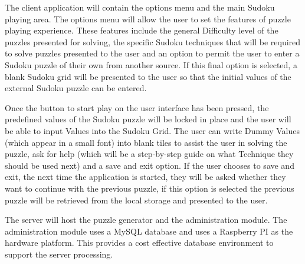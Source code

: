 \documentclass[fleqn]{article}
\begin{document}
The client application will contain the options menu and the main Sudoku playing area. The options menu will allow the user to set the features of puzzle playing experience. These features include the general Difficulty level of the puzzles presented for solving, the specific Sudoku techniques that will be required to solve puzzles presented to the user and an option to permit the user to enter a Sudoku puzzle of their own from another source. If this final option is selected, a blank Sudoku grid will be presented to the user so that the initial values of the external Sudoku puzzle can be entered.

Once the button to start play on the user interface has been pressed, the predefined values of the Sudoku puzzle will be locked in place and the user will be able to input Values into the Sudoku Grid. The user can write Dummy Values (which appear in a small font) into blank tiles to assist the user in solving the puzzle, ask for help (which will be a step-by-step guide on what Technique they should be used next) and a save and exit option. If the user chooses to save and exit, the next time the application is started, they will be asked whether they want to continue with the previous puzzle, if this option is selected the previous puzzle will be retrieved from the local storage and presented to the user.

The server will host the puzzle generator and the administration module. The administration module uses a MySQL database and uses a Raspberry PI as the hardware platform. This provides a cost effective database environment to support the server processing.
\end{document}
